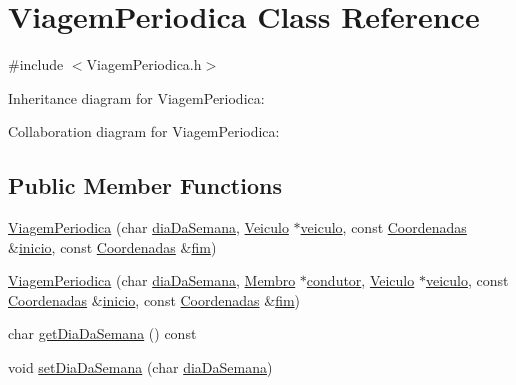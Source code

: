 \hypertarget{class_viagem_periodica}{\section{Viagem\+Periodica Class Reference}
\label{class_viagem_periodica}
}


{\ttfamily \#include $<$Viagem\+Periodica.\+h$>$}



Inheritance diagram for Viagem\+Periodica\+:


Collaboration diagram for Viagem\+Periodica\+:
\subsection*{Public Member Functions}
\begin{DoxyCompactItemize}
\item 
\hyperlink{class_viagem_periodica_aac7574ed67f67dad6d16751c2d024670}{Viagem\+Periodica} (char \hyperlink{class_viagem_periodica_ac53255ef9f3e6d862e2ac803d7e45206}{dia\+Da\+Semana}, \hyperlink{class_veiculo}{Veiculo} $\ast$\hyperlink{class_viagem_aee9386a44de6b6afb11faff59331f7b5}{veiculo}, const \hyperlink{class_coordenadas}{Coordenadas} \&\hyperlink{class_viagem_a0a871b6782ab9b478a530f2c15dc1e32}{inicio}, const \hyperlink{class_coordenadas}{Coordenadas} \&\hyperlink{class_viagem_ab54e61d41be0157f9e75b14c8e06137f}{fim})
\item 
\hyperlink{class_viagem_periodica_a13fc61d10fe1d8f3ced8e7f9557c2553}{Viagem\+Periodica} (char \hyperlink{class_viagem_periodica_ac53255ef9f3e6d862e2ac803d7e45206}{dia\+Da\+Semana}, \hyperlink{class_membro}{Membro} $\ast$\hyperlink{class_viagem_a015bb952a7afce6a348d0a9f88bdaf5c}{condutor}, \hyperlink{class_veiculo}{Veiculo} $\ast$\hyperlink{class_viagem_aee9386a44de6b6afb11faff59331f7b5}{veiculo}, const \hyperlink{class_coordenadas}{Coordenadas} \&\hyperlink{class_viagem_a0a871b6782ab9b478a530f2c15dc1e32}{inicio}, const \hyperlink{class_coordenadas}{Coordenadas} \&\hyperlink{class_viagem_ab54e61d41be0157f9e75b14c8e06137f}{fim})
\item 
char \hyperlink{class_viagem_periodica_a18ccdd2f58dd4fbf3dc95e1927a61af7}{get\+Dia\+Da\+Semana} () const 
\item 
void \hyperlink{class_viagem_periodica_a1351abcca608d827c5c4eb7ba2f45e14}{set\+Dia\+Da\+Semana} (char \hyperlink{class_viagem_periodica_ac53255ef9f3e6d862e2ac803d7e45206}{dia\+Da\+Semana})
\end{DoxyCompactItemize}
